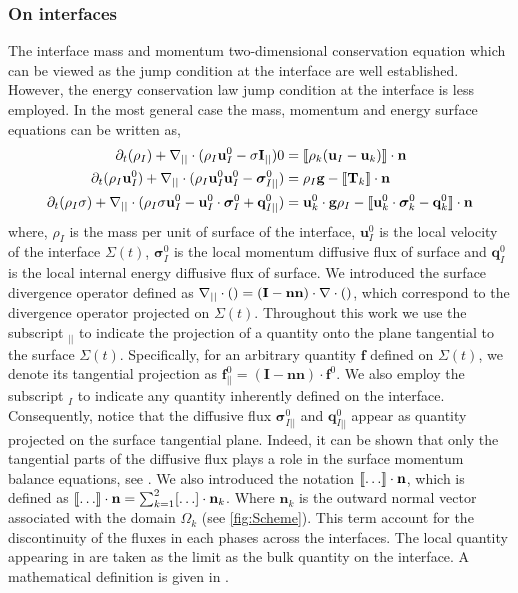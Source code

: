 \subsubsection{On interfaces}
The interface mass and momentum two-dimensional conservation equation which can be viewed as the jump condition at the interface are well established.
However, the energy conservation law jump condition at the interface is less employed.
In the most general case the mass, momentum and energy surface equations can be written as, 
\begin{align}
    \label{eq:dt_rhoI}
    \partial_t (\rho_I)  
    + \mathbf{\nabla}_{||}\cdot (
    \rho_I\textbf{u}_I^0
    -\sigma \textbf{I}_{||} )
    0
    &= 
    \llbracket 
        \rho_k (\textbf{u}_I - \textbf{u}_k)
     \rrbracket \cdot \textbf{n}\\
    \label{eq:dt_rhoIu_I}
    \partial_t (\rho_I\textbf{u}_I^0)  
    + \mathbf{\nabla}_{||}\cdot (
    \rho_I\textbf{u}_I^0\textbf{u}_I^0
    - \bm{\sigma}_{I||}^0)
    &= 
    \rho_I \textbf{g}
    - \llbracket 
        \mathbf{T}_k
     \rrbracket \cdot \textbf{n}\\
    \label{eq:dt_rhoIE_I}
    \partial_t (\rho_I\sigma)  
    + \mathbf{\nabla}_{||}\cdot (
        \rho_I\sigma\textbf{u}_I^0
        - \textbf{u}_I^0 \cdot \bm{\sigma}_I^0 
        + \textbf{q}_{I||}^0
        )
    &= 
    \textbf{u}_k^0 \cdot \textbf{g}  \rho_I
    - \llbracket \textbf{u}_k^0 \cdot \bm{\sigma}_k^0 - \textbf{q}_k^0 \rrbracket \cdot \textbf{n}
\end{align} 
where, $\rho_I$ is the mass per unit of surface of the interface, $\textbf{u}_I^0$ is the local velocity of the interface $\Sigma(t)$, $\bm{\sigma}_I^0$ is the local momentum diffusive flux of surface and $\textbf{q}_I^0$ is the local internal energy diffusive flux of surface. 
We introduced the surface divergence operator defined as $\mathbf{\nabla}_{||}\cdot ()= (\textbf{I}-\textbf{nn})\cdot \mathbf{\nabla}\cdot ()$, which correspond to the divergence operator projected on $\Sigma(t)$. 
Throughout this work we use the subscript  $_{||}$ to indicate the projection of a quantity onto the plane tangential to the surface $\Sigma(t)$. 
Specifically, for an arbitrary quantity $\textbf{f}$ defined on $\Sigma(t)$, we denote its tangential projection as $\textbf{f}_{||}^0 = (\textbf{I}-\textbf{nn})\cdot \textbf{f}^0$. 
We also employ the subscript $_I$ to indicate any quantity inherently defined on the interface. 
Consequently, notice that the diffusive flux $\bm{\sigma}_{I||}^0$ and $\textbf{q}_{I||}^0$ appear as quantity projected on the surface tangential plane.
Indeed, it can be shown that only the tangential parts of the diffusive flux plays a role in the surface momentum balance equations, see \citet{slattery2007interfacial}.
We also introduced the notation $\llbracket \ldots \rrbracket \cdot \textbf{n}$, which is defined as $\llbracket \ldots \rrbracket \cdot \textbf{n} = \sum_{k=1}^2 [\ldots] \cdot \textbf{n}_k$.
Where $\textbf{n}_k$ is the outward normal vector associated with the domain $\Omega_k$ (see \ref{fig:Scheme}).
This term account for the discontinuity of the fluxes in each phases across the interfaces.
The local quantity appearing in are taken as the limit as the bulk quantity on the interface. 
A mathematical definition is given in \citet{bothe2022sharp}. 

